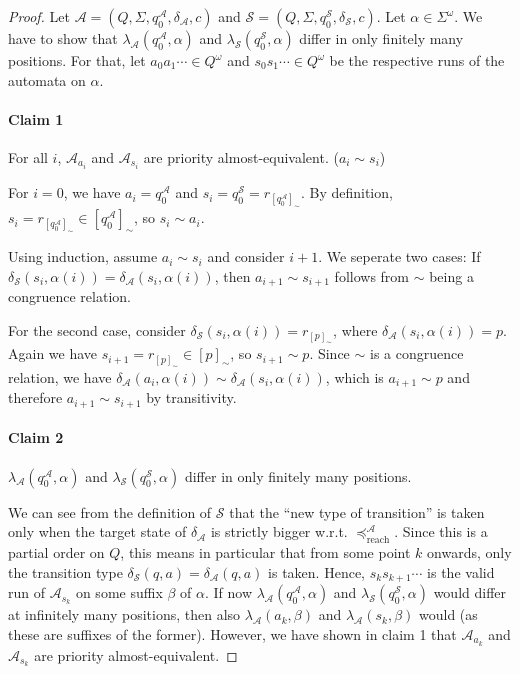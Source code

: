 \begin{proof}
	Let $\mathcal{A} = (Q, \Sigma, q_0^\mathcal{A}, \delta_\mathcal{A}, c)$ and $\mathcal{S} = (Q, \Sigma, q_0^\mathcal{S}, \delta_\mathcal{S}, c)$. Let $\alpha \in \Sigma^\omega$. We have to show that $\lambda_\mathcal{A}(q_0^\mathcal{A}, \alpha)$ and $\lambda_\mathcal{S}(q_0^\mathcal{S}, \alpha)$ differ in only finitely many positions. For that, let $a_0 a_1 \cdots \in Q^\omega$ and $s_0 s_1 \cdots \in Q^\omega$ be the respective runs of the automata on $\alpha$.
	
	\paragraph{Claim 1} For all $i$, $\mathcal{A}_{a_i}$ and $\mathcal{A}_{s_i}$ are priority almost-equivalent. ($a_i \sim s_i$)
	
	For $i = 0$, we have $a_i = q_0^\mathcal{A}$ and $s_i = q_0^\mathcal{S} = r_{[q_0^\mathcal{A}]_\sim}$. By definition, $s_i = r_{[q_0^\mathcal{A}]_\sim} \in [q_0^\mathcal{A}]_\sim$, so $s_i \sim a_i$.
	
	Using induction, assume $a_i \sim s_i$ and consider $i+1$. We seperate two cases: If $\delta_\mathcal{S}(s_i, \alpha(i)) = \delta_\mathcal{A}(s_i, \alpha(i))$, then $a_{i+1} \sim s_{i+1}$ follows from $\sim$ being a congruence relation.
	
	For the second case, consider $\delta_\mathcal{S}(s_i, \alpha(i)) = r_{[p]_\sim}$, where $\delta_\mathcal{A}(s_i, \alpha(i)) = p$. Again we have $s_{i+1} = r_{[p]_\sim} \in [p]_\sim$, so $s_{i+1} \sim p$. Since $\sim$ is a congruence relation, we have $\delta_\mathcal{A}(a_i, \alpha(i)) \sim \delta_\mathcal{A}(s_i, \alpha(i))$, which is $a_{i+1} \sim p$ and therefore $a_{i+1} \sim s_{i+1}$ by transitivity.
	
	\paragraph{Claim 2} $\lambda_\mathcal{A}(q_0^\mathcal{A}, \alpha)$ and $\lambda_\mathcal{S}(q_0^\mathcal{S}, \alpha)$ differ in only finitely many positions.
	
	We can see from the definition of $\mathcal{S}$ that the \enquote{new type of transition} is taken only when the target state of $\delta_\mathcal{A}$ is strictly bigger w.r.t. $\preceq_\text{reach}^\mathcal{A}$. Since this is a partial order on $Q$, this means in particular that from some point $k$ onwards, only the transition type $\delta_\mathcal{S}(q, a) = \delta_\mathcal{A}(q, a)$ is taken. Hence, $s_k s_{k+1} \cdots$ is the valid run of $\mathcal{A}_{s_k}$ on some suffix $\beta$ of $\alpha$. If now $\lambda_\mathcal{A}(q_0^\mathcal{A}, \alpha)$ and $\lambda_\mathcal{S}(q_0^\mathcal{S}, \alpha)$ would differ at infinitely many positions, then also $\lambda_\mathcal{A}(a_k, \beta)$ and $\lambda_\mathcal{A}(s_k, \beta)$ would (as these are suffixes of the former). However, we have shown in claim 1 that $\mathcal{A}_{a_k}$ and $\mathcal{A}_{s_k}$ are priority almost-equivalent.
\end{proof}

